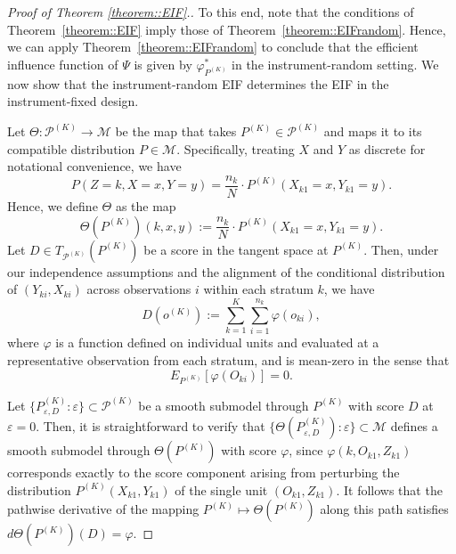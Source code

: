 \documentclass[11pt]{article}
\theoremstyle{plain}
\theoremstyle{definition}
\theoremstyle{remark}
\theoremstyle{definition}
\begin{document}
\begin{proof}[Proof of Theorem \ref{theorem::EIF}.]

 

To this end, note that the conditions of Theorem~\ref{theorem::EIF} imply those of Theorem~\ref{theorem::EIFrandom}. Hence, we can apply Theorem~\ref{theorem::EIFrandom} to conclude that the efficient influence function of \( \Psi \) is given by \( \varphi_{P^{(K)}}^* \) in the instrument-random setting. We now show that the instrument-random EIF determines the EIF in the instrument-fixed design.


Let \( \Theta: \mathcal{P}^{(K)} \rightarrow \mathcal{M} \) be the map that takes \( P^{(K)} \in \mathcal{P}^{(K)} \) and maps it to its compatible distribution \( P \in \mathcal{M} \). Specifically, treating \( X \) and \( Y \) as discrete for notational convenience, we have
\[
P(Z = k, X = x, Y = y) = \frac{n_k}{N} \cdot P^{(K)}(X_{k1} = x, Y_{k1} = y).
\]
Hence, we define \( \Theta \) as the map
\[
\Theta(P^{(K)})(k, x, y) := \frac{n_k}{N} \cdot P^{(K)}(X_{k1} = x, Y_{k1} = y).
\]
Let \( D \in T_{\mathcal{P}^{(K)}}(P^{(K)}) \) be a score in the tangent space at \( P^{(K)} \). Then, under our independence assumptions and the alignment of the conditional distribution of \( (Y_{ki}, X_{ki}) \) across observations \( i \) within each stratum \( k \), we have
\[
D(o^{(K)}) :=   \sum_{k=1}^K \sum_{i=1}^{n_k} \varphi(o_{ki}),
\]
where \( \varphi \) is a function defined on individual units and evaluated at a representative observation from each stratum, and is mean-zero in the sense that
\[
  E_{P^{(K)}}[\varphi(O_{ki})] = 0.
\]


Let \( \{P_{\varepsilon, D}^{(K)} : \varepsilon\} \subset \mathcal{P}^{(K)} \) be a smooth submodel through \( P^{(K)} \) with score \( D \) at \( \varepsilon = 0 \). Then, it is straightforward to verify that \( \{\Theta(P_{\varepsilon, D}^{(K)}) : \varepsilon\} \subset \mathcal{M} \) defines a smooth submodel through \( \Theta(P^{(K)}) \) with score \( \varphi \), since \( \varphi(k, O_{k1}, Z_{k1}) \) corresponds exactly to the score component arising from perturbing the distribution $P^{(K)}(X_{k1}  , Y_{k1}  )$ of the single unit \( (O_{k1}, Z_{k1}) \). It follows that the pathwise derivative of the mapping $P^{(K)} \mapsto \Theta(P^{(K)})$ along this path satisfies $d\Theta(P^{(K)})(D) = \varphi$.



\end{proof}
\end{document}
